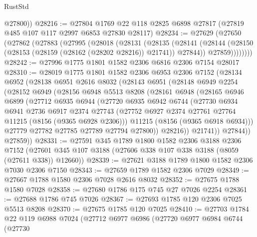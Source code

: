\begin{lexlean}{RustStd}
\begin{coremodule}
        @27800))
@28216 := @27804 @1769 @22 @118 @2825 @6898 @27817 (@27819 @485 @107 @117 @2997 @6853 @27830 @28117)
@28234 := @27629
    (@27650
      (@27862
        (@27883
          (@27995
            (@28018
              (@28131
                (@28135
                  (@28141
                    (@28144 (@28150 (@28153 (@28159 (@28162 (@28202 @28216)) @21741)) @27844))
                    @27859))))))))
@28242 := @27996 @1775 @1801 @1582 @2306 @6816 @2306 @7154 @28017
@28310 := @28019
    @1775
    @1801
    @1582
    @2306
    @6953
    @2306
    @7152
    (@28134
      @6952
      (@28138
        @6951
        @2616
        @8032
        (@28143
          @6951
          (@28148
            @6949
            @2254
            (@28152
              @6949
              (@28156
                @6948
                @5513
                @8208
                (@28161
                  @6948
                  (@28165
                    @6946
                    @6899
                    (@27712
                      @6935
                      @6944
                      (@27720
                        @6935
                        @6942
                        @6744
                        (@27730
                          @6934
                          @6941
                          @2736
                          @6917
                          @2374
                          @27743
                          (@27752 @6927 @2374 @27761 @27764 @11215 (@8156 (@9365 @6928 @2306)))
                          @11215
                          (@8156 (@9365 @6918 @6934)))
                        @27779
                        @27782
                        @27785
                        @27789
                        @27794
                        @27800))
                    @28216))
                @21741))
            @27844))
        @27859))
@28331 := @27591
    @345
    @1789
    @1800
    @1582
    @2306
    @3188
    @2306
    @7152
    (@27601 @345 @107 @3188 (@27606 @338 @107 @338 @3188 (@8059 (@27611 @338)) @12660))
@28339 := @27621 @3188 @1789 @1800 @1582 @2306 @7030 @2306 @7150
@28343 := @27659 @1789 @1582 @2306 @7029
@28349 := @27667 @1788 @1580 @2306 @7028 @2616 @8032
@28352 := @27675 @1788 @1580 @7028
@28358 := @27680 @1786 @175 @745 @27 @7026 @2254
@28361 := @27688 @1786 @745 @7026
@28367 := @27693 @1785 @120 @2306 @7025 @5513 @8208
@28370 := @27675 @1785 @120 @7025
@28410 := @27703
    @1784
    @22
    @119
    @6988
    @7024
    (@27712
      @6977
      @6986
      (@27720
        @6977
        @6984
        @6744
        (@27730

\end{coremodule}
\end{lexlean}
